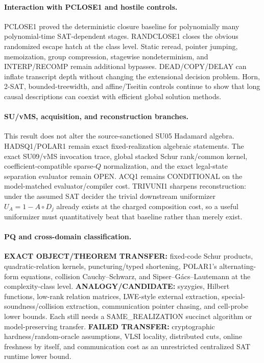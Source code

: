 \documentclass[11pt]{article}
\begin{document}
\paragraph{Interaction with PCLOSE1 and hostile controls.}
PCLOSE1 proved the deterministic closure baseline for polynomially many polynomial-time SAT-dependent
stages. RANDCLOSE1 closes the obvious randomized escape hatch at the class level. Static reread,
pointer jumping, memoization, group compression, stagewise nondeterminism, and INTERP/RECOMP remain
additional bypasses. DEAD/COPY/DELAY can inflate transcript depth without changing the extensional
decision problem. Horn, 2-SAT, bounded-treewidth, and affine/Tseitin controls continue to show that
long causal descriptions can coexist with efficient global solution methods.

\paragraph{SU/vMS, acquisition, and reconstruction branches.}
This result does not alter the source-sanctioned SU05 Hadamard algebra. HADSQ1/POLAR1 remain exact
fixed-realization algebraic statements. The exact SU09/vMS invocation trace, global stacked Schur
rank/common kernel, coefficient-compatible sparse-\(Q\) normalization, and the exact legal-state
separation evaluator remain OPEN. ACQ1 remains CONDITIONAL on the model-matched evaluator/compiler
cost. TRIVUNI1 sharpens reconstruction: under the assumed SAT decider the trivial downstream
uniformizer \(U_A=1-A\circ D_j\) already exists at the charged composition cost, so a useful
uniformizer must quantitatively beat that baseline rather than merely exist.

\paragraph{PQ and cross-domain classification.}
\textbf{EXACT OBJECT/THEOREM TRANSFER:} fixed-code Schur products, quadratic-relation kernels,
puncturing/typed shortening, POLAR1's alternating-form equations, collision Cauchy--Schwarz, and
Sipser--G\'acs--Lautemann at the complexity-class level.
\textbf{ANALOGY/CANDIDATE:} syzygies, Hilbert functions, low-rank relation matrices, LWE-style external
extraction, special-soundness/collision extraction, communication pointer chasing, and cell-probe
lower bounds. Each still needs a SAME\_REALIZATION succinct algorithm or model-preserving transfer.
\textbf{FAILED TRANSFER:} cryptographic hardness/random-oracle assumptions, VLSI locality, distributed
cuts, online freshness by itself, and communication cost as an unrestricted centralized SAT runtime
lower bound.
\end{document}
